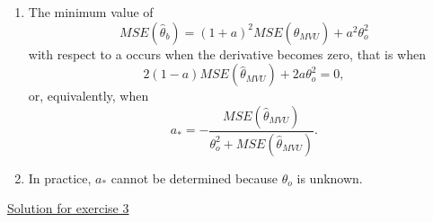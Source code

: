 \documentclass[12pt]{book}
\begin{document}
\begin{enumerate}[label=(\alph*)]
	\item The minimum value of 
	\begin{equation*}
	MSE(\hat{\theta}_{b}) = (1+a)^2MSE(\hat{\theta}_{MVU}) + a^2\theta_o^2
	\end{equation*}
	with respect to a occurs when the derivative becomes zero, that is when
	\begin{equation*}
	2(1-a)MSE(\hat{\theta}_{MVU}) + 2a\theta_o^2 = 0,
	\end{equation*}
	or, equivalently, when 
	\begin{equation*}
	a_* = - \frac{MSE(\hat{\theta}_{MVU})}{\theta_o^2 + MSE(\hat{\theta}_{MVU})}.
	\end{equation*}
	\item In practice, $a_*$ cannot be determined because $\theta_o$ is unknown.
\end{enumerate}

\vspace{0.3 cm}
{\underline{\large Solution for exercise 3}}
\vspace{0.3 cm}
\end{document}
